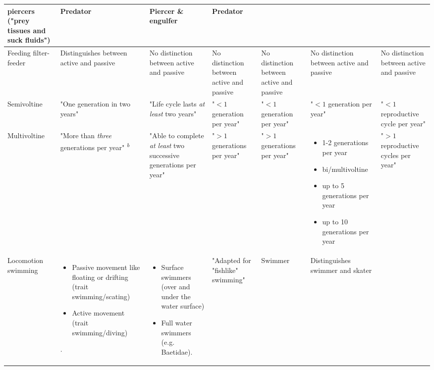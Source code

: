 \documentclass[../Draft_harmonization_paper.tex]{subfiles}
\begin{document}
\begin{landscape}
\begin{longtable}{m{1.7cm}|m{3cm}|m{3cm}|m{3cm}|m{3cm}|m{3cm}|m{3cm}}
        piercers ("prey tissues and suck fluids") & 
        Predator &
        Piercer \& engulfer &
        Predator
        \\ 
        \midrule
        Feeding filter-feeder & 
        Distinguishes between active and passive &
        No distinction between active and passive &
        No distinction between active and passive &
        No distinction between active and passive &
        No distinction between active and passive &
        No distinction between active and passive
        \\
        \toprule[.1em]
        Semivoltine & 
        "One generation in two years" & 
        "Life cycle lasts \textit{at least} two years" & 
        "$< 1$ generation per year" & 
        "$< 1$ generation per year" & 
        "$< 1$ generation per year" & 
        "$< 1$ reproductive cycle per year"
        \\
        \midrule
        Multivoltine & 
        "More than \textit{three} generations per year" \textsuperscript{\textit{b}}& 
        "Able to complete \textit{at least} two successive generations per year" &
        "$> 1$ generations per year" &
        "$> 1$ generations per year" & 
        \begin{itemize}
            \item 1-2 generations per year
            \item bi/multivoltine
            \item up to 5 generations per year
            \item up to 10 generations per year
        \end{itemize}
        & 
        "$> 1$ reproductive cycles per year"
        \\
        \toprule[.1em]
        Locomotion swimming & 
        \begin{itemize}
            \item Passive movement like floating or drifting (trait swimming/scating)
            \item Active movement (trait swimming/diving)
        \end{itemize}. &
        \begin{itemize}
            \item Surface swimmers (over and under the water surface)
            \item Full water swimmers (e.g. Baetidae).
        \end{itemize} & 
        "Adapted for "fishlike" swimming" & 
        Swimmer & 
        Distinguishes swimmer and skater & 

\end{longtable}
\end{landscape}
\end{document}
